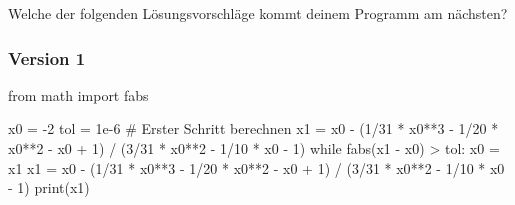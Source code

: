 \documentclass[
  letterpaper,
  DIV=11,
  oneside]{scrreprt}
\newenvironment{Shaded}{\begin{snugshade}}{\end{snugshade}}
\newcommand{\BuiltInTok}[1]{\textcolor[rgb]{0.00,0.23,0.31}{#1}}
\newcommand{\CommentTok}[1]{\textcolor[rgb]{0.37,0.37,0.37}{#1}}
\newcommand{\ControlFlowTok}[1]{\textcolor[rgb]{0.00,0.23,0.31}{#1}}
\newcommand{\DecValTok}[1]{\textcolor[rgb]{0.68,0.00,0.00}{#1}}
\newcommand{\FloatTok}[1]{\textcolor[rgb]{0.68,0.00,0.00}{#1}}
\newcommand{\ImportTok}[1]{\textcolor[rgb]{0.00,0.46,0.62}{#1}}
\newcommand{\NormalTok}[1]{\textcolor[rgb]{0.00,0.23,0.31}{#1}}
\newcommand{\OperatorTok}[1]{\textcolor[rgb]{0.37,0.37,0.37}{#1}}
\theoremstyle{definition}
\theoremstyle{definition}
\theoremstyle{remark}
\begin{document}
\begin{tcolorbox}[enhanced jigsaw, title=\textcolor{quarto-callout-tip-color}{\faLightbulb}\hspace{0.5em}{Lösung}, colbacktitle=quarto-callout-tip-color!10!white, bottomrule=.15mm, titlerule=0mm, colback=white, breakable, colframe=quarto-callout-tip-color-frame, bottomtitle=1mm, toptitle=1mm, leftrule=.75mm, arc=.35mm, left=2mm, rightrule=.15mm, toprule=.15mm, opacitybacktitle=0.6, opacityback=0, coltitle=black]

Welche der folgenden Lösungsvorschläge kommt deinem Programm am
nächsten?

\hypertarget{version-1}{%
\subsubsection{Version 1}\label{version-1}}

\begin{Shaded}
\begin{Highlighting}[]
\ImportTok{from}\NormalTok{ math }\ImportTok{import}\NormalTok{ fabs}

\NormalTok{x0 }\OperatorTok{=} \OperatorTok{{-}}\DecValTok{2}
\NormalTok{tol }\OperatorTok{=} \FloatTok{1e{-}6}
\CommentTok{\# Erster Schritt berechnen}
\NormalTok{x1 }\OperatorTok{=}\NormalTok{ x0 }\OperatorTok{{-}}\NormalTok{ (}\DecValTok{1}\OperatorTok{/}\DecValTok{31} \OperatorTok{*}\NormalTok{ x0}\OperatorTok{**}\DecValTok{3} \OperatorTok{{-}} \DecValTok{1}\OperatorTok{/}\DecValTok{20} \OperatorTok{*}\NormalTok{ x0}\OperatorTok{**}\DecValTok{2} \OperatorTok{{-}}\NormalTok{ x0 }\OperatorTok{+} \DecValTok{1}\NormalTok{) }\OperatorTok{/}\NormalTok{ (}\DecValTok{3}\OperatorTok{/}\DecValTok{31} \OperatorTok{*}\NormalTok{ x0}\OperatorTok{**}\DecValTok{2} \OperatorTok{{-}} \DecValTok{1}\OperatorTok{/}\DecValTok{10} \OperatorTok{*}\NormalTok{ x0 }\OperatorTok{{-}} \DecValTok{1}\NormalTok{)}
\ControlFlowTok{while}\NormalTok{ fabs(x1 }\OperatorTok{{-}}\NormalTok{ x0) }\OperatorTok{\textgreater{}}\NormalTok{ tol:}
\NormalTok{    x0 }\OperatorTok{=}\NormalTok{ x1}
\NormalTok{    x1 }\OperatorTok{=}\NormalTok{ x0 }\OperatorTok{{-}}\NormalTok{ (}\DecValTok{1}\OperatorTok{/}\DecValTok{31} \OperatorTok{*}\NormalTok{ x0}\OperatorTok{**}\DecValTok{3} \OperatorTok{{-}} \DecValTok{1}\OperatorTok{/}\DecValTok{20} \OperatorTok{*}\NormalTok{ x0}\OperatorTok{**}\DecValTok{2} \OperatorTok{{-}}\NormalTok{ x0 }\OperatorTok{+} \DecValTok{1}\NormalTok{) }\OperatorTok{/}\NormalTok{ (}\DecValTok{3}\OperatorTok{/}\DecValTok{31} \OperatorTok{*}\NormalTok{ x0}\OperatorTok{**}\DecValTok{2} \OperatorTok{{-}} \DecValTok{1}\OperatorTok{/}\DecValTok{10} \OperatorTok{*}\NormalTok{ x0 }\OperatorTok{{-}} \DecValTok{1}\NormalTok{)}
\BuiltInTok{print}\NormalTok{(x1)}
\end{Highlighting}
\end{Shaded}


\end{tcolorbox}
\end{document}
